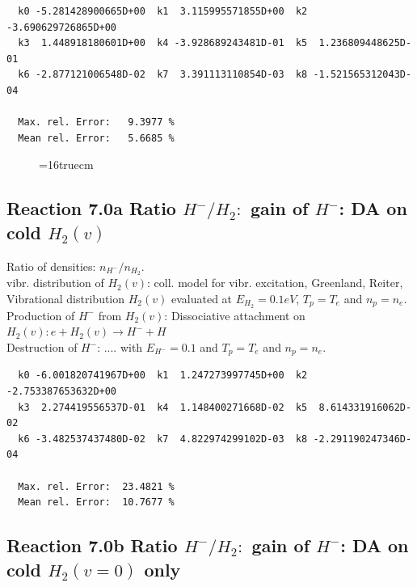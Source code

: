 \documentclass[12pt,dvips]{article}
\begin{document}
\begin{small}\begin{verbatim}
  k0 -5.281428900665D+00  k1  3.115995571855D+00  k2 -3.690629726865D+00
  k3  1.448918180601D+00  k4 -3.928689243481D-01  k5  1.236809448625D-01
  k6 -2.877121006548D-02  k7  3.391113110854D-03  k8 -1.521565312043D-04

  Max. rel. Error:   9.3977 %
  Mean rel. Error:   5.6685 %
\end{verbatim}\end{small}


\begin{figure} \label{2.0a}
\epsfxsize=16truecm
\end{figure}

\newpage

\subsection{
Reaction 7.0a      Ratio $H^-/H_2: $ gain of $H^-$:  DA on cold $H_2(v)$
}



  Ratio of densities: $n_{H^-}/n_{H_2}$. \\
  vibr. distribution of $H_2(v)$: coll. model for vibr. excitation, Greenland, Reiter, \cite{kn:Green}\\

  Vibrational distribution $H_2(v)$ evaluated
  at $E_{H_2} = 0.1 eV$, $T_p = T_e$ and $n_p = n_e$.\\
  Production of $H^-$ from $H_2(v)$:  Dissociative attachment on $H_2(v):  e+H_2(v) \rightarrow H^- + H$  \\
  Destruction of $H^-$: .... with $E_{H^-}=0.1$ and $T_p = T_e$ and $n_p = n_e$.

\begin{small}\begin{verbatim}
  k0 -6.001820741967D+00  k1  1.247273997745D+00  k2 -2.753387653632D+00
  k3  2.274419556537D-01  k4  1.148400271668D-02  k5  8.614331916062D-02
  k6 -3.482537437480D-02  k7  4.822974299102D-03  k8 -2.291190247346D-04

  Max. rel. Error:  23.4821 %
  Mean rel. Error:  10.7677 %
\end{verbatim}\end{small}

\subsection{
Reaction 7.0b      Ratio $H^-/H_2: $ gain of $H^-$:  DA on cold $H_2(v=0)$ only
}
\end{document}
